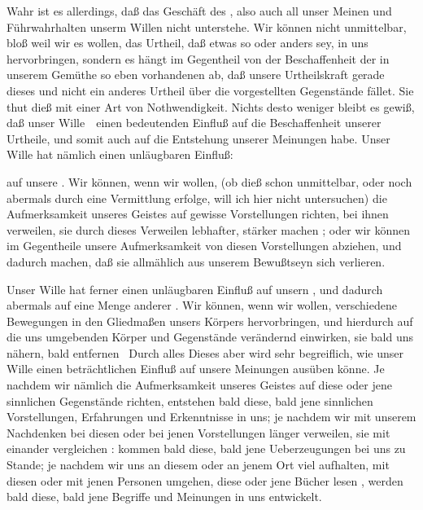 \begin{aufza}
\item Wahr ist es allerdings, daß das Geschäft des , also auch all unser Meinen und Führwahrhalten unserm Willen nicht  unterstehe. Wir können nicht unmittelbar, bloß weil wir es wollen, das Urtheil, daß etwas so oder anders sey, in uns hervorbringen, sondern es hängt im Gegentheil von der Beschaffenheit der in unserem Gemüthe so eben vorhandenen  ab, daß unsere Urtheilskraft gerade dieses und nicht ein anderes Urtheil über die vorgestellten Gegenstände fället. Sie thut dieß mit einer Art von Nothwendigkeit. Nichts desto weniger bleibt es gewiß, daß unser Wille~\ einen bedeutenden  Einfluß auf die Beschaffenheit unserer Urtheile, und somit auch auf die Entstehung unserer Meinungen habe. Unser Wille hat nämlich einen unläugbaren Einfluß:
\begin{aufzb}
\item auf unsere . Wir können, wenn wir wollen, (ob dieß schon unmittelbar, oder noch abermals durch eine Vermittlung erfolge, will ich hier nicht untersuchen) die Aufmerksamkeit unseres Geistes auf gewisse Vorstellungen richten, bei ihnen verweilen, sie durch dieses Verweilen lebhafter, stärker machen \usw ; oder wir können im Gegentheile unsere Aufmerksamkeit von diesen Vorstellungen abziehen, und dadurch machen, daß sie allmählich aus unserem Bewußtseyn sich verlieren.
\item Unser Wille hat ferner einen unläugbaren Einfluß auf unsern , und dadurch abermals auf eine Menge anderer . Wir können, wenn wir wollen, verschiedene Bewegungen in den Gliedmaßen unsers Körpers hervorbringen, und hierdurch auf die uns umgebenden Körper und Gegenstände verändernd einwirken, sie bald uns nähern, bald entfernen \usw\ Durch alles Dieses aber wird sehr begreiflich, wie unser Wille einen beträchtlichen Einfluß auf unsere Meinungen ausüben könne. Je nachdem wir nämlich die Aufmerksamkeit unseres Geistes auf diese oder jene sinnlichen Gegenstände richten, entstehen bald diese, bald jene sinnlichen Vorstellungen, Erfahrungen und Erkenntnisse in uns; je nachdem wir mit unserem Nachdenken bei diesen oder bei jenen Vorstellungen länger verweilen, sie mit einander vergleichen \usw : kommen bald diese, bald jene Ueberzeugungen bei uns zu Stande; je nachdem wir uns an diesem oder an jenem Ort viel aufhalten, mit diesen oder mit jenen Personen umgehen, diese oder jene Bücher lesen \udgl , werden bald diese, bald jene Begriffe und Meinungen in uns entwickelt.

\end{aufzb}
\end{aufza}
